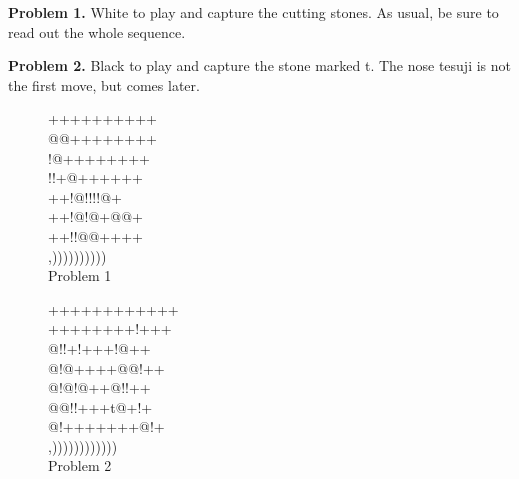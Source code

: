 \documentclass[mcrownvopaper,10pt,twopage,onecolumn,final]{memoir}
\begin{document}
\noindent
\textbf{Problem 1.} White to play and capture the cutting stones. As usual, be
sure to read out the whole sequence.

\noindent
\textbf{Problem 2.} Black to play and capture the stone marked {\gnos t}. The nose
tesuji is not the first move, but comes later.
\begin{figure}[ht]
    \begin{minipage}[c]{0.45\linewidth}
        \centering    
        {\gnos%
        ++++++++++\\
        @@++++++++\\
        !@++++++++\\
        !!+@++++++\\
        ++!@!!!!@+\\
        ++!@!@+@@+\\
        ++!!@@++++\\
        ,))))))))))\\
        }
        Problem 1
    \end{minipage}%
    \begin{minipage}[c]{0.55\linewidth}
        \centering    
        {\gnos%
        ++++++++++++\\
        ++++++++!+++\\
        @!!+!+++!@++\\
        @!@++++@@!++\\
        @!@!@++@!!++\\
        @@!!+++t@+!+\\
        @!+++++++@!+\\
        ,))))))))))))\\
        }
        Problem 2
    \end{minipage}%
\end{figure}
\end{document}
